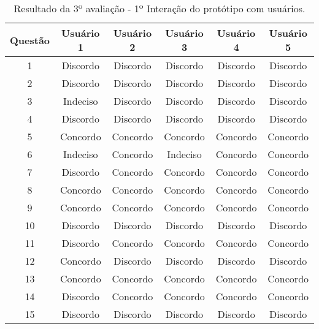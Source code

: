 				\begin{table}[h]
					\centering 
					\begin{tabular}{|c|c|c|c|c|c|}

						\hline

						Questão & Usuário 1 & Usuário 2 & Usuário 3 & Usuário 4 & Usuário 5\\
						
						\hline
						
						1 & Discordo & Discordo & Discordo & Discordo & Discordo \\
						
						2 & Discordo & Discordo & Discordo & Discordo & Discordo \\
						
						3 & Indeciso & Discordo & Discordo & Discordo & Discordo \\

						4 & Discordo & Discordo & Discordo & Discordo & Discordo \\

						5 & Concordo & Concordo & Concordo & Concordo & Concordo \\

						6 & Indeciso & Concordo & Indeciso & Concordo & Concordo \\

						7 & Discordo & Concordo & Concordo & Concordo & Concordo \\

						8 & Concordo & Concordo & Concordo & Concordo & Concordo \\

						9 & Concordo & Concordo & Concordo & Concordo & Concordo \\

						10 & Discordo & Discordo & Discordo & Discordo & Discordo \\

						11 & Discordo & Concordo & Concordo & Concordo & Concordo \\

						12 & Concordo & Discordo & Discordo & Discordo & Discordo \\

						13 & Concordo & Concordo & Concordo & Concordo & Concordo \\

						14 & Discordo & Concordo & Concordo & Concordo & Concordo \\

						15 & Discordo & Discordo & Discordo & Discordo & Discordo \\

						\hline

					\end{tabular}
					\caption[Resultado da 3º avaliação - 1º Interação do protótipo com usuários]{Resultado da 3º avaliação - 1º Interação do protótipo com usuários.}
					\label{tab:terceiraAvaliacao1_tables}
				\end{table}


